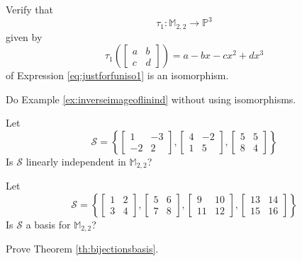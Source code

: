 \documentclass{ximera}
\begin{document}
\begin{problem}\label{prob:tauone}
Verify that $$\tau_1:\mathbb{M}_{2,2}\rightarrow\mathbb{P}^3$$
given by
$$\tau_1\left(\begin{bmatrix}a&b\\c&d\end{bmatrix}\right)=a-bx-cx^2+dx^3$$
of Expression \ref{eq:justforfuniso1} is an isomorphism.
\end{problem}

\begin{problem}\label{prob:noiso}
Do Example \ref{ex:inverseimageoflinind} without using isomorphisms.  
\end{problem}

\begin{problem}\label{prob:useisoshowlinind}
Let 
$$\mathcal{S}=\left\{\begin{bmatrix}1&-3\\-2&2\end{bmatrix}, \begin{bmatrix}4&-2\\1&5\end{bmatrix}, \begin{bmatrix}5&5\\8&4\end{bmatrix}\right\}$$
Is $\mathcal{S}$ linearly independent in $\mathbb{M}_{2,2}$?  
\end{problem}

\begin{problem}\label{prob:basism22iso}
Let 
$$\mathcal{S}=\left\{\begin{bmatrix}1&2\\3&4\end{bmatrix}, \begin{bmatrix}5&6\\7&8\end{bmatrix}, \begin{bmatrix}9&10\\11&12\end{bmatrix}, \begin{bmatrix}13&14\\15&16\end{bmatrix}\right\}$$
Is $\mathcal{S}$ a basis for $\mathbb{M}_{2,2}$? 
\end{problem}

\begin{problem}\label{prob:bijectionsbasisproof}
Prove Theorem \ref{th:bijectionsbasis}.
\end{problem}
\end{document}
